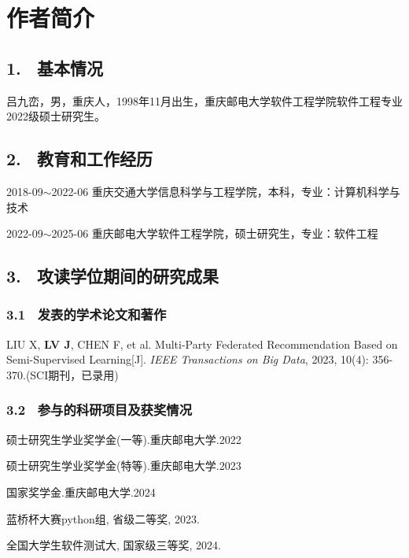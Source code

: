 \specialsectioning


\chapter{作者简介}
\thispagestyle{others}
\pagestyle{others}
\xiaosi

\section{1. \ 基本情况}
吕九峦，男，重庆人，1998年11月出生，重庆邮电大学软件工程学院软件工程专业2022级硕士研究生。

\section{2. \ 教育和工作经历}
2018-09$\sim$2022-06 重庆交通大学信息科学与工程学院，本科，专业：计算机科学与技术

2022-09$\sim$2025-06 重庆邮电大学软件工程学院，硕士研究生，专业：软件工程

\section{3. \ 攻读学位期间的研究成果}

\vspace{0.2cm}


\subsection{3.1 \ 发表的学术论文和著作}
\begin{enumerate}[label={[{\arabic*}]}, leftmargin=2em]
	\item  LIU X, \textbf{LV J}, CHEN F, et al. Multi-Party Federated Recommendation Based on Semi-Supervised Learning[J]. \textit{IEEE Transactions on Big Data}, 2023, 10(4): 356-370.(SCI期刊，已录用)
\end{enumerate}

\subsection{3.2 \ 参与的科研项目及获奖情况}
\begin{enumerate}[label={[{\arabic*}]}, leftmargin=2em, itemsep=0pt, parsep=0pt, topsep=0pt]
	\item  硕士研究生学业奖学金(一等).重庆邮电大学.2022
	\item  硕士研究生学业奖学金(特等).重庆邮电大学.2023
	\item  国家奖学金.重庆邮电大学.2024
	\item  蓝桥杯大赛python组, 省级二等奖, 2023.
	\item  全国大学生软件测试大, 国家级三等奖, 2024.
\end{enumerate}






